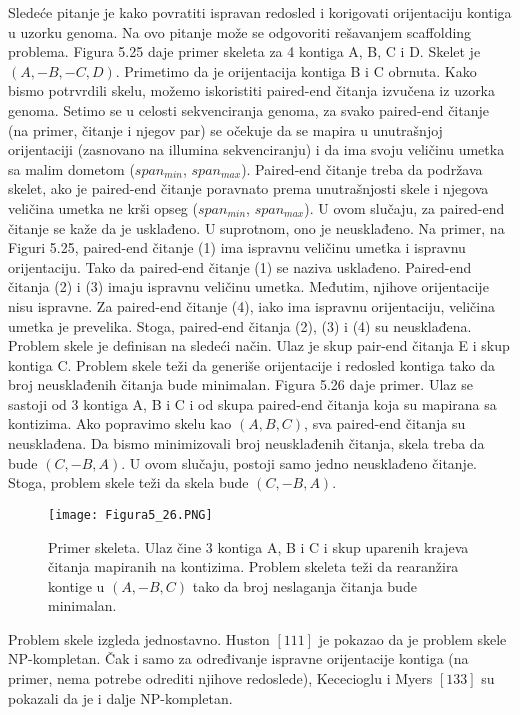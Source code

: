 \documentclass{article}
\begin{document}
Sledeće pitanje je kako povratiti ispravan redosled i korigovati orijentaciju kontiga u uzorku genoma. Na ovo pitanje može se odgovoriti rešavanjem scaffolding problema. Figura 5.25 daje primer skeleta za 4 kontiga A, B, C i D. Skelet je $(A, -B, -C, D)$. Primetimo da je orijentacija kontiga B i C obrnuta. Kako bismo potrvrdili skelu, možemo iskoristiti paired-end čitanja izvučena iz uzorka genoma. Setimo se u celosti sekvenciranja genoma, za svako  paired-end čitanje (na primer, čitanje i njegov par) se očekuje da se mapira u unutrašnjoj orijentaciji (zasnovano na illumina sekvenciranju) i da ima svoju veličinu umetka sa malim dometom ($span_{min}$, $span_{max}$). Paired-end čitanje treba da podržava skelet, ako je paired-end čitanje poravnato prema unutrašnjosti skele i njegova veličina umetka ne krši opseg ($span_{min}$, $span_{max}$). U ovom slučaju, za paired-end čitanje se kaže da je usklađeno. U suprotnom, ono je neusklađeno. Na primer, na Figuri 5.25, paired-end čitanje (1) ima ispravnu veličinu umetka i ispravnu orijentaciju. Tako da paired-end čitanje (1) se naziva usklađeno. Paired-end čitanja (2) i (3) imaju ispravnu veličinu umetka. Međutim, njihove orijentacije nisu ispravne. Za paired-end čitanje (4), iako ima ispravnu orijentaciju, veličina umetka je prevelika. Stoga, paired-end čitanja (2), (3) i (4) su neusklađena.\\

Problem skele je definisan na sledeći način. Ulaz je skup pair-end čitanja E i skup kontiga C. Problem skele teži da generiše orijentacije i redosled kontiga tako da broj neusklađenih čitanja bude minimalan. Figura 5.26 daje primer. Ulaz se sastoji od 3 kontiga A, B i C i od skupa paired-end čitanja koja su mapirana sa kontizima. Ako popravimo skelu kao $(A, B, C)$, sva paired-end čitanja su neusklađena. Da bismo minimizovali broj neusklađenih čitanja, skela treba da bude $(C, -B, A)$. U ovom slučaju, postoji samo jedno neusklađeno čitanje. Stoga, problem skele teži da skela bude $(C, -B, A)$.\\

\begin{figure}[h]
\centering
\texttt{[image: Figura5\_26.PNG]}
\caption{Primer skeleta. Ulaz čine 3 kontiga A, B i C i skup uparenih krajeva čitanja mapiranih na kontizima. Problem skeleta teži da rearanžira kontige u $(A, -B, C)$ tako da broj neslaganja čitanja bude minimalan.}
\end{figure}

Problem skele izgleda jednostavno. Huston $[111]$ je pokazao da je problem skele NP-kompletan. Čak i samo za određivanje ispravne orijentacije kontiga (na primer, nema potrebe odrediti njihove redoslede), Kececioglu i Myers $[133]$ su pokazali da je i dalje NP-kompletan. \\
\end{document}
